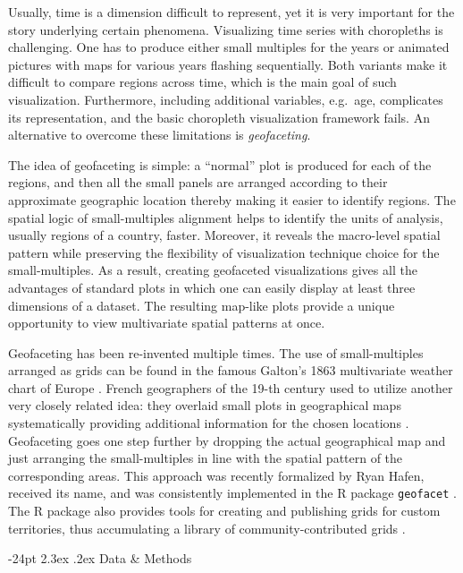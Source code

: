\documentclass[10pt, twoside, parskip=half]{article}
\makeatletter
\renewcommand\section{\@startsection {section}{1}{\z@}%
                                   {-24pt}%
                                   {2.3ex \@plus.2ex}%
                                   {\normalfont\large\bfseries}}
\makeatother
\begin{document}
Usually, time is a dimension difficult to represent, yet it is very important for the story underlying certain phenomena. Visualizing time series with choropleths is challenging. One has to produce either small multiples for the years or animated pictures with maps for various years flashing sequentially. Both variants make it difficult to compare regions across time, which is the main goal of such visualization. Furthermore, including additional variables, e.g.~age, complicates its representation, and the basic choropleth visualization framework fails. An alternative to overcome these limitations is \emph{geofaceting}.

The idea of geofaceting is simple: a ``normal'' plot is produced for each of the regions, and then all the small panels are arranged according to their approximate geographic location thereby making it easier to identify regions. The spatial logic of small-multiples alignment helps to identify the units of analysis, usually regions of a country, faster. Moreover, it reveals the macro-level spatial pattern while preserving the flexibility of visualization technique choice for the small-multiples. As a result, creating geofaceted visualizations gives all the advantages of standard plots in which one can easily display at least three dimensions of a dataset. The resulting map-like plots provide a unique opportunity to view multivariate spatial patterns at once.

Geofaceting has been re-invented multiple times. The use of small-multiples arranged as grids can be found in the famous Galton's 1863 multivariate weather chart of Europe \citep{galton1863, friendly2008hodv}. French geographers of the 19-th century used to utilize another very closely related idea: they overlaid small plots in geographical maps systematically providing additional information for the chosen locations \citep{palsky1996}. Geofaceting goes one step further by dropping the actual geographical map and just arranging the small-multiples in line with the spatial pattern of the corresponding areas. This approach was recently formalized by Ryan Hafen, received its name, and was consistently implemented in the R package \texttt{geofacet} \citep{hafen2019}. The R package also provides tools for creating and publishing grids for custom territories, thus accumulating a library of community-contributed grids \citep{hafen2018rh}.

\hypertarget{data-methods}{%
\section{Data \& Methods}\label{data-methods}}
\end{document}

